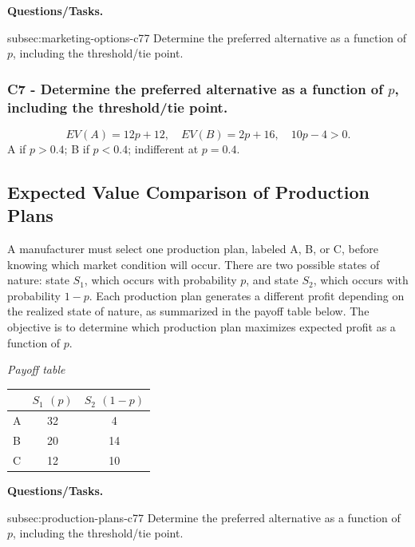     \textbf{Questions/Tasks.}
\begin{enumerate}
    \CriterionTask
    {subsec:marketing-options-c7}{7}
    {Determine the preferred alternative as a function of $p$, including the threshold/tie point.}
\end{enumerate}

\subsubsection*{C7 - Determine the preferred alternative as a function of $p$, including the threshold/tie point.}
\label{subsec:marketing-options-c7}

\[
    EV(A)=12p+12,\quad EV(B)=2p+16,\quad 10p-4>0.
\]
A if $p>0.4$; B if $p<0.4$; indifferent at $p=0.4$.


\subsection{Expected Value Comparison of Production Plans}
\label{sec:production-plans}
    A manufacturer must select one production plan, labeled A, B, or C, before knowing which market condition will occur.
    There are two possible states of nature: state $S_1$, which occurs with probability $p$, and state $S_2$, which occurs with probability $1-p$.
    Each production plan generates a different profit depending on the realized state of nature, as summarized in the payoff table below.
    The objective is to determine which production plan maximizes expected profit as a function of $p$.

    \begin{center}
        \textit{Payoff table} \\
        \begin{tabular}{l c c}
            \toprule
            & $S_1$ $(p)$ & $S_2$ $(1-p)$ \\
            \midrule
            A & 32 & 4 \\
            B & 20 & 14 \\
            C & 12 & 10 \\
            \bottomrule
        \end{tabular}
    \end{center}

    \textbf{Questions/Tasks.}
\begin{enumerate}
    \CriterionTask
    {subsec:production-plans-c7}{7}
    {Determine the preferred alternative as a function of $p$, including the threshold/tie point.}
\end{enumerate}

